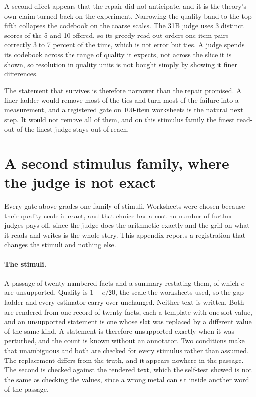 \documentclass{article}
\theoremstyle{definition}
\theoremstyle{remark}
\begin{document}
A second effect appears that the repair did not anticipate, and it is the theory's own claim turned
back on the experiment. Narrowing the quality band to the top fifth collapses the codebook on the
coarse scales. The 31B judge uses 3 distinct scores of the 5 and 10 offered, so its greedy read-out
orders one-item pairs correctly 3 to 7 percent of the time, which is not error but ties. A judge
spends its codebook across the range of quality it expects, not across the slice it is shown, so
resolution in quality units is not bought simply by showing it finer differences.

The statement that survives is therefore narrower than the repair promised. A finer ladder would remove
most of the ties and turn most of the failure into a measurement, and a registered gate on
100-item worksheets is the natural next step. It would not remove all of them, and on this stimulus
family the finest read-out of the finest judge stays out of reach.

\section{A second stimulus family, where the judge is not exact}
\label{app:family}

Every gate above grades one family of stimuli. Worksheets were chosen because their quality scale is exact, and that choice has a cost no number of further judges pays off, since the judge does the arithmetic exactly and the grid on what it reads and writes is the whole story. This appendix reports a registration that changes the stimuli and nothing else.

\paragraph{The stimuli.}
A passage of twenty numbered facts and a summary restating them, of which $e$ are unsupported. Quality is $1-e/20$, the scale the worksheets used, so the gap ladder and every estimator carry over unchanged. Neither text is written. Both are rendered from one record of twenty facts, each a template with one slot value, and an unsupported statement is one whose slot was replaced by a different value of the same kind. A statement is therefore unsupported exactly when it was perturbed, and the count is known without an annotator. Two conditions make that unambiguous and both are checked for every stimulus rather than assumed. The replacement differs from the truth, and it appears nowhere in the passage. The second is checked against the rendered text, which the self-test showed is not the same as checking the values, since a wrong metal can sit inside another word of the passage.
\end{document}
